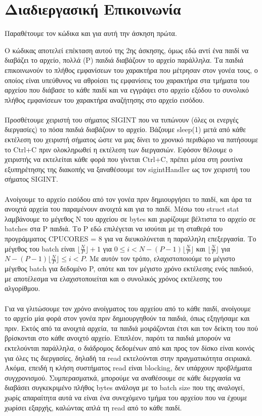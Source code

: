 \documentclass{article}
\begin{document}
	
	\section{Διαδιεργασική Επικοινωνία}
	
	Παραθέτουμε τον κώδικα και για αυτή την άσκηση πρώτα.
	
	
	
	\noindent Ο κώδικας αποτελεί επέκταση αυτού της 2ης άσκησης, όμως εδώ αντί ένα παιδί να διαβάζει το αρχείο, πολλά (P) παιδιά διαβάζουν το αρχείο παράλληλα. Τα παιδιά επικοινωνούν το πλήθος εμφανίσεων του χαρακτήρα που μέτρησαν στον γονέα τους, ο οποίος είναι υπεύθυνος να αθροίσει τις εμφανίσεις του χαρακτήρα στα τμήματα του αρχείου που διάβασε το κάθε παιδί και να εγγράψει στο αρχείο εξόδου το συνολικό πλήθος εμφανίσεων του χαρακτήρα αναζήτησης στο αρχείο εισόδου.\\
	\\
	Προσθέτουμε χειριστή του σήματος SIGINT που να τυπώνουν (όλες οι ενεργές διεργασίες) το πόσα παιδιά διαβάζουν το αρχείο. Βάζουμε sleep(1) μετά από κάθε εκτέλεση του χειριστή σήματος ώστε να μας δίνει το χρονικό περιθώριο να πατήσουμε το Ctrl+C πριν ολοκληρωθεί η εκτέλεση των διεργασιών. Εφόσον θέλουμε ο χειριστής να εκτελείται κάθε φορά που γίνεται Ctrl+C, πρέπει μέσα στη ρουτίνα εξυπηρέτησης της διακοπής να ξαναθέσουμε τον sigintHandler ως τον χειριστή του σήματος SIGINT.\\
	\\
	Ανοίγουμε το αρχείο εισόδου από τον γονέα πριν δημιουργήσει το παιδί, και άρα τα ανοιχτά αρχεία του παραμένουν ανοιχτά και για το παιδί. Μέσω του struct stat λαμβάνουμε το μέγεθος N του αρχείου σε bytes και χωρίζουμε βέλτιστα το αρχείο σε batches στα P παιδιά. Το P εδώ επιλέγεται να ισούται με τη σταθερά του προγράμματος CPUCORES = 8 για να διευκολύνεται η παραλληλη επεξεργασία. Το μέγεθος του batch είναι $\lfloor \frac{N}{P}\rfloor + 1$ για $0 \leq i < N - (P-1)\lfloor \frac{N}{P}\rfloor$ και $\lfloor \frac{N}{P}\rfloor$ για $N - (P-1)\lfloor \frac{N}{P}\rfloor \leq i < P$. Με αυτόν τον τρόπο, ελαχιστοποιούμε το μέγιστο μέγεθος batch για δεδομένο P, οπότε και τον μέγιστο χρόνο εκτέλεσης ενός παιδιού, με αποτέλεσμα να ελαχιστοποιείται και ο συνολικός χρόνος εκτέλεσης του αλγορίθμου.\\
	\\
	Για να γλιτώσουμε τον χρόνο ανοίγματος του αρχείου από το κάθε παιδί, ανοίγουμε το αρχείο μία φορά στον γονέα πριν δημιουργηθούν τα παιδιά, όπως εξηγήσαμε και πριν. Εκτός από τα ανοιχτά αρχεία, τα παιδιά μοιράζονται έτσι και τον δείκτη του πού βρίσκονται στο κάθε ανοιχτό αρχείο. Επιπλέον, παρότι τα παιδιά μπορούν να εκτελούνται παράλληλα, ο διάδρομος δεδομένων από και προς τον δίσκο είναι κοινός για όλες τις διεργασίες, δηλαδή τα read εκτελούνται στην πραγματικότητα σειριακά. Ακόμα, επειδή η κλήση συστήματος read είναι blocking, δεν υπάρχουν προβλήματα συγχρονισμού. Συμπερασματκά, μπορούμε να αναθέσουμε σε κάθε διεργασία να διαβάσει συγκεκριμένο πλήθος bytes ανάλογα με το batch size που της αναλογεί, χωρίς απαραίτητα αυτά να είναι ένα συνεχόμενο τμήμα του αρχείου που να έχουμε χωρίσει εξαρχής, καλώντας απλά τη read από το κάθε παιδί.\\
\end{document}
